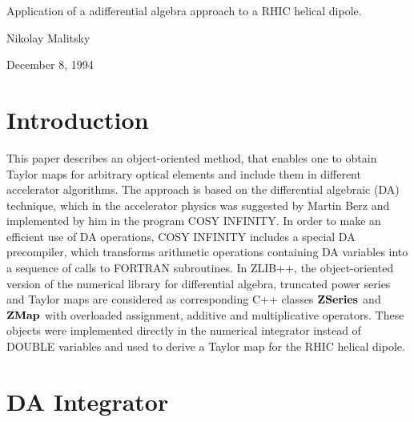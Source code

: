 

\hspace{8cm}{\large RHIC/AP/51}
\vspace{3cm}

\begin{center}
{\LARGE
Application of a adifferential algebra approach to a RHIC helical dipole.
}

\vspace{0.6cm}

{\large Nikolay Malitsky }
\vspace{0.6cm}

{\large December 8, 1994}
\end{center}
\vspace{1.4cm}

\section{Introduction}
This paper describes an object-oriented method, that enables one
to obtain Taylor maps for arbitrary optical elements and include them 
in different accelerator algorithms. The approach is based on the differential algebraic (DA) technique, which in the accelerator physics
was suggested by Martin Berz and implemented by him in the program COSY INFINITY\cite{COSY}. 
In order to make an efficient use of DA operations,
COSY INFINITY includes a special DA precompiler, which transforms 
arithmetic operations containing DA variables into a sequence of calls to
FORTRAN subroutines. 
In ZLIB++\cite{ZLIB}, 
the object-oriented version of the numerical library for differential 
algebra, truncated power series and Taylor maps are considered as corresponding
C++ classes ${\bf ZSeries}$ and ${\bf ZMap}$ with overloaded assignment,
additive and multiplicative operators. These objects were implemented directly 
in the numerical integrator instead of DOUBLE variables and used to derive 
a Taylor map for the RHIC helical dipole.

\section{DA Integrator}

